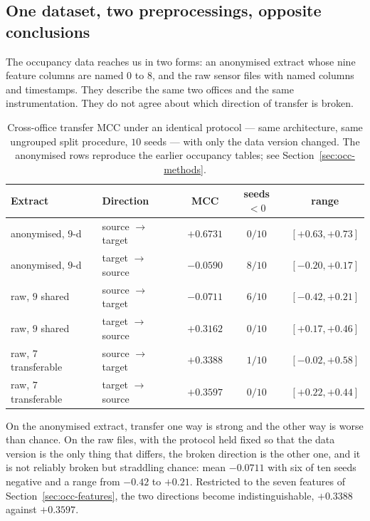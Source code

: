 \subsection{One dataset, two preprocessings, opposite conclusions}
\label{sec:occ-contrast}

The occupancy data reaches us in two forms: an anonymised extract whose nine feature
columns are named $0$ to $8$, and the raw sensor files with named columns and timestamps.
They describe the same two offices and the same instrumentation. They do not agree about
which direction of transfer is broken.

\begin{table}[t]
\centering
\caption{Cross-office transfer MCC under an identical protocol --- same architecture, same
ungrouped split procedure, $10$ seeds --- with only the data version changed. The
anonymised rows reproduce the earlier occupancy tables; see Section~\ref{sec:occ-methods}.}
\label{tab:occversion}
\small
\begin{tabular}{@{}llccc@{}}
\toprule
Extract & Direction & MCC & seeds $<0$ & range \\
\midrule
anonymised, $9$-d & source $\to$ target & $\mathbf{+0.6731}$ & $0/10$ & $[+0.63,+0.73]$ \\
anonymised, $9$-d & target $\to$ source & $\mathbf{-0.0590}$ & $8/10$ & $[-0.20,+0.17]$ \\
\addlinespace[2pt]
raw, $9$ shared   & source $\to$ target & $-0.0711$ & $6/10$ & $[-0.42,+0.21]$ \\
raw, $9$ shared   & target $\to$ source & $+0.3162$ & $0/10$ & $[+0.17,+0.46]$ \\
\addlinespace[2pt]
raw, $7$ transferable & source $\to$ target & $+0.3388$ & $1/10$ & $[-0.02,+0.58]$ \\
raw, $7$ transferable & target $\to$ source & $+0.3597$ & $0/10$ & $[+0.22,+0.44]$ \\
\bottomrule
\end{tabular}
\end{table}

On the anonymised extract, transfer one way is strong and the other way is worse than
chance. On the raw files, with the protocol held fixed so that the data version is the
only thing that differs, the broken direction is the other one, and it is not reliably
broken but straddling chance: mean $-0.0711$ with six of ten seeds negative and a range
from $-0.42$ to $+0.21$. Restricted to the seven features of
Section~\ref{sec:occ-features}, the two directions become
indistinguishable, $+0.3388$ against $+0.3597$.

